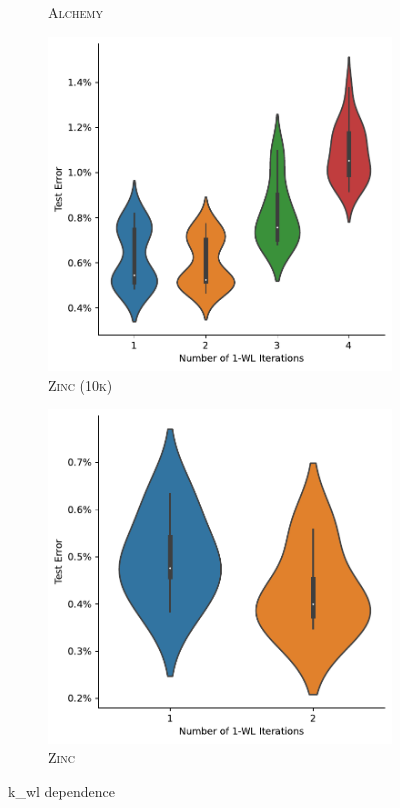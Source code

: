 \begin{figure}
\begin{subfigure}[b]{0.19\textwidth}
        \caption{\scriptsize\textsc{Alchemy}}
	\end{subfigure}
	\hfill
	\begin{subfigure}[b]{0.19\textwidth}
		\centering
		\includegraphics[width=\textwidth]{Figures/k_wl_violin_Zinc 10k.pdf}
        \caption{\scriptsize\textsc{Zinc (10k)}}
	\end{subfigure}
	\hfill
	\begin{subfigure}[b]{0.19\textwidth}
		\centering
		\includegraphics[width=\textwidth]{Figures/k_wl_violin_Zinc.pdf}
        \caption{\scriptsize\textsc{Zinc}}
	\end{subfigure}
	\caption{k\_wl dependence}
	\label{fig:k_wl_dependence}
\end{figure}


